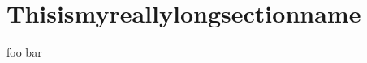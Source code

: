 \documentclass[]{beamer}
\begin{document}
    \section{Thisismyreally\-longsectionname}

    \begin{frame}{foo}
        bar
    \end{frame}
\end{document}
